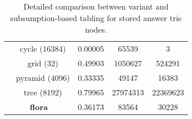 \begin{table}[ht]
{\begin{tabular}{cc|c|cc}
\\
&  cycle (16384) &  0.00005 &  65539 & 3
\\
&  grid (32) &  0.49903 &  1050627 & 524291
\\
&  pyramid (4096) &  0.33335 &  49147 & 16383
\\
&  tree (8192) &  0.79965 &  27974313 & 22369623
\\
\hline
\multicolumn{2}{c|}{\textbf{flora}} & 0.36173 & 83564 & 30228 \\
\hline
\hline
\end{tabular}
}
\caption{Detailed comparison between variant and subsumption-based tabling for stored answer trie nodes.}
\label{tbl:results_detail_space_sub}
\end{table}
